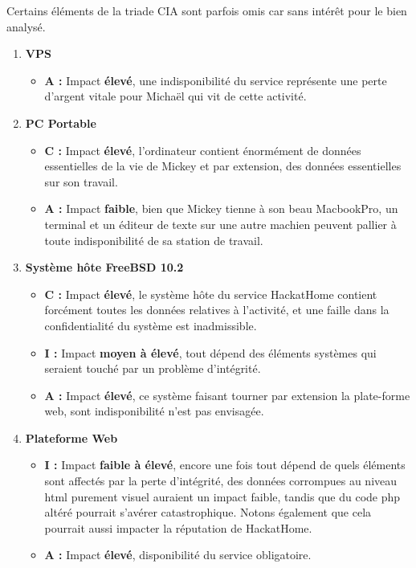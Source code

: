 \documentclass[a4paper,10pt,final,fleqn]{article}
\begin{document}
			Certains éléments de la triade CIA sont parfois omis car sans intérêt pour le bien analysé. \\

			\begin{enumerate}
				\item \textbf{VPS}

					\begin{itemize}
						\item \textbf{A : } Impact \textbf{élevé}, une indisponibilité du service représente une perte d'argent vitale pour Michaël qui vit de cette activité.\\
					\end{itemize}

				\item \textbf{PC Portable}

					\begin{itemize}
						\item \textbf{C : } Impact \textbf{élevé}, l'ordinateur contient énormément de données essentielles de la vie de Mickey et par extension, des données essentielles sur son travail.
						\item \textbf{A : } Impact \textbf{faible}, bien que Mickey tienne à son beau MacbookPro, un terminal et un éditeur de texte sur une autre machien peuvent pallier à toute indisponibilité de sa station de travail.
					\end{itemize}

				\item \textbf{Système hôte FreeBSD 10.2}

					\begin{itemize}
						\item \textbf{C : } Impact \textbf{élevé}, le système hôte du service HackatHome contient forcément toutes les données relatives à l'activité, et une faille dans la confidentialité du système est inadmissible.
						\item \textbf{I : } Impact \textbf{moyen à élevé}, tout dépend des éléments systèmes qui seraient touché par un problème d'intégrité.
						\item \textbf{A : } Impact \textbf{élevé}, ce système faisant tourner par extension la plate-forme web, sont indisponibilité n'est pas envisagée.
					\end{itemize}

				\item \textbf{Plateforme Web}

					\begin{itemize}
						\item \textbf{I : } Impact \textbf{faible à élevé}, encore une fois tout dépend de quels éléments sont affectés par la perte d'intégrité, des données corrompues au niveau html purement visuel auraient un impact faible, tandis que du code php altéré pourrait s'avérer catastrophique. Notons également que cela pourrait aussi impacter la réputation de HackatHome.
						\item \textbf{A : } Impact \textbf{élevé}, disponibilité du service obligatoire.
					\end{itemize}


\end{enumerate}
\end{document}
